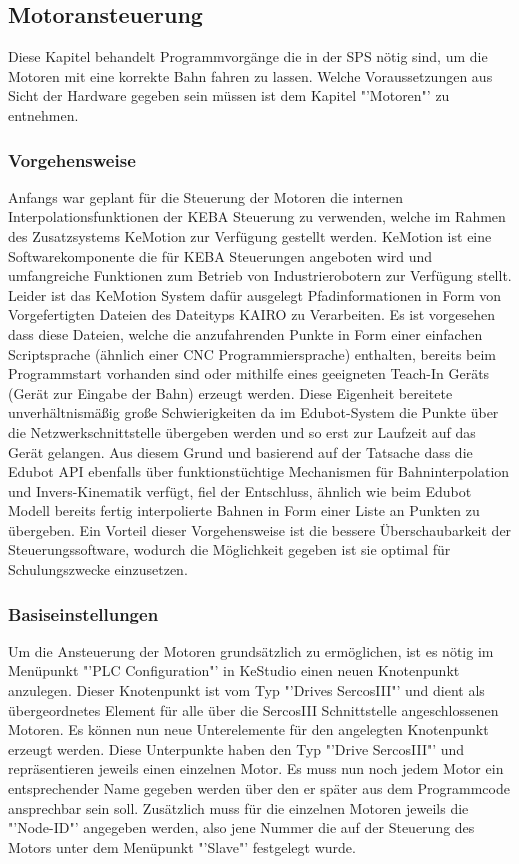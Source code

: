\subsection{Motoransteuerung}
Diese Kapitel behandelt Programmvorgänge die in der SPS nötig sind, um die Motoren mit eine korrekte Bahn fahren zu lassen. Welche Voraussetzungen aus Sicht der Hardware gegeben sein müssen ist dem Kapitel "'Motoren"' zu entnehmen.

\subsubsection{Vorgehensweise}
Anfangs war geplant für die Steuerung der Motoren die internen Interpolationsfunktionen der KEBA Steuerung zu verwenden, welche im Rahmen des Zusatzsystems KeMotion zur Verfügung gestellt werden. KeMotion ist eine Softwarekomponente die für KEBA Steuerungen angeboten wird und umfangreiche Funktionen zum Betrieb von Industrierobotern zur Verfügung stellt.
Leider ist das KeMotion System dafür ausgelegt Pfadinformationen in Form von Vorgefertigten Dateien des Dateityps KAIRO zu Verarbeiten. Es ist vorgesehen dass diese Dateien, welche die anzufahrenden Punkte in Form einer einfachen Scriptsprache (ähnlich einer CNC Programmiersprache) enthalten, bereits beim Programmstart vorhanden sind oder mithilfe eines geeigneten Teach-In Geräts (Gerät zur Eingabe der Bahn) erzeugt werden. Diese Eigenheit bereitete unverhältnismäßig große Schwierigkeiten da im Edubot-System die Punkte über die Netzwerkschnittstelle übergeben werden und so erst zur Laufzeit auf das Gerät gelangen. 
Aus diesem Grund und basierend auf der Tatsache dass die Edubot API ebenfalls über funktionstüchtige Mechanismen für Bahninterpolation und Invers-Kinematik verfügt, fiel der Entschluss, ähnlich wie beim Edubot Modell bereits fertig interpolierte Bahnen in Form einer Liste an Punkten zu übergeben. Ein Vorteil dieser Vorgehensweise ist die bessere Überschaubarkeit der Steuerungssoftware, wodurch die Möglichkeit gegeben ist sie optimal für Schulungszwecke einzusetzen.

\subsubsection{Basiseinstellungen}
Um die Ansteuerung der Motoren grundsätzlich zu ermöglichen, ist es nötig im Menüpunkt "'PLC Configuration"' in KeStudio einen neuen Knotenpunkt anzulegen. Dieser Knotenpunkt ist vom Typ "'Drives SercosIII"' und dient als übergeordnetes Element für alle über die SercosIII Schnittstelle angeschlossenen Motoren. 
Es können nun neue Unterelemente für den angelegten Knotenpunkt erzeugt werden. Diese Unterpunkte haben den Typ "'Drive SercosIII"' und repräsentieren jeweils einen einzelnen Motor. Es muss nun noch jedem Motor ein entsprechender Name gegeben werden über den er später aus dem Programmcode ansprechbar sein soll. Zusätzlich muss für die einzelnen Motoren jeweils die "'Node-ID"' angegeben werden, also jene Nummer die auf der Steuerung des Motors unter dem Menüpunkt "'Slave"' festgelegt wurde.

